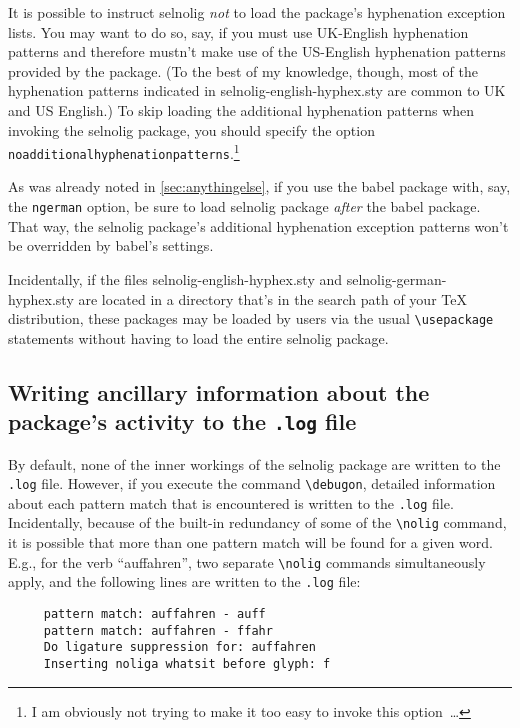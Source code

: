 \documentclass[11pt]{article}
\newcommand{\pkg}[1]{\textsf{#1}}
\newcommand{\opt}[1]{\texttt{#1}}
\newcommand{\cmmd}[1]{\texttt{\textbackslash #1}}
\begin{document}
It is possible to instruct \pkg{selnolig} \emph{not} to load the package's hyphenation exception lists. You may want to do so, say, if you must use UK-English hyphenation patterns and therefore mustn't make use of the US-English hyphenation patterns provided by the package. (To the best of my knowledge, though, most of the hyphenation patterns indicated in \pkg{selnolig-english-hyphex.sty} are common to UK and US English.) To skip loading the additional hyphenation patterns when invoking the \pkg{selnolig} package, you should specify the option \opt{noadditional\-hyphen\-a\-tion\-patterns}.\footnote{I am obviously not trying to make it too easy to invoke this option~\dots}

As was already noted in \cref{sec:anythingelse}, if you use the \pkg{babel} package with, say, the \opt{ngerman} option, be sure to load \pkg{selnolig} package \emph{after} the \pkg{babel} package. That way, the \pkg{selnolig} package's additional hyphenation exception patterns won't be overridden by \pkg{babel}'s settings.

Incidentally, if the files \pkg{selnolig-english-hyphex.sty} and \pkg{selnolig-german-hyphex.sty} are located in a directory that's in the search path of your TeX distribution, these packages may be loaded by users via the usual \cmmd{usepackage} statements without having to load the entire \pkg{selnolig} package.



\subsection{Writing ancillary information about the package's activity to the \opt{.log} file} \label{sec:debugon}

By default, none of the inner workings of the \pkg{selnolig} package are written to the \opt{.log} file. However, if you execute the command \cmmd{debugon}, detailed information about each pattern match that is encountered is written to the \opt{.log} file. Incidentally, because of the built-in redundancy of some of the \cmmd{nolig} command, it is possible that more than one pattern match will be found for a given word. E.g., for the verb \enquote{auffahren}, two separate \cmmd{nolig} commands simultaneously apply, and the following lines are written to the \opt{.log} file:
\begin{Verbatim}
     pattern match: auffahren - auff
     pattern match: auffahren - ffahr
     Do ligature suppression for: auffahren
     Inserting noliga whatsit before glyph: f
\end{Verbatim}
\end{document}
